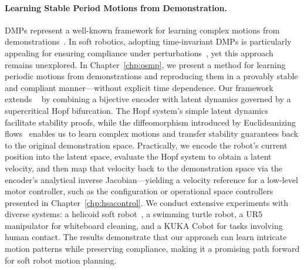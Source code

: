 \paragraph{Learning Stable Period Motions from Demonstration.}
\glspl{DMP} represent a well-known framework for learning complex motions from demonstrations~\citep{ijspeert2013dynamical, saveriano2023dynamic}. In soft robotics, adopting time-invariant \glspl{DMP} is particularly appealing for ensuring compliance under perturbations~\citep{ijspeert2013dynamical}, yet this approach remains unexplored. In Chapter~\ref{chp:osmp}, we present a method for learning periodic motions from demonstrations and reproducing them in a provably stable and compliant manner—without explicit time dependence.
% 
Our framework extends ~\citep{ijspeert2013dynamical, rana2020euclideanizing, perez2023stable} by combining a bijective encoder with latent dynamics governed by a supercritical Hopf bifurcation. The Hopf system’s simple latent dynamics facilitate stability proofs, while the diffeomorphism introduced by Euclideanizing flows~\citep{dinh2016density, rana2020euclideanizing} enables us to learn complex motions and transfer stability guarantees back to the original demonstration space. Practically, we encode the robot’s current position into the latent space, evaluate the Hopf system to obtain a latent velocity, and then map that velocity back to the demonstration space via the encoder’s analytical inverse Jacobian—yielding a velocity reference for a low-level motor controller, such as the configuration or operational space controllers presented in Chapter~\ref{chp:hsacontrol}.
% 
We conduct extensive experiments with diverse systems: a helicoid soft robot~\citep{guan2023trimmed}, a swimming turtle robot, a UR5 manipulator for whiteboard cleaning, and a KUKA \gls{Cobot} for tasks involving human contact. The results demonstrate that our approach can learn intricate motion patterns while preserving compliance, making it a promising path forward for soft robot motion planning.